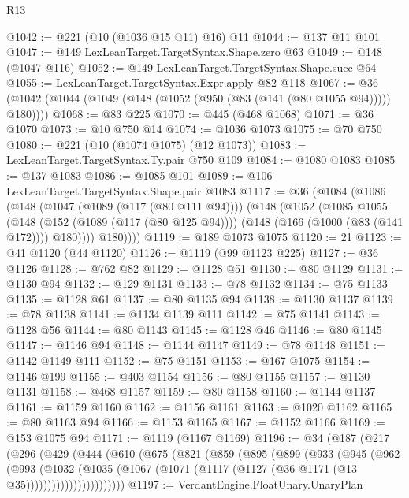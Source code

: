 \begin{lexlean}{R13}
\begin{coremodule}
@1042 := @221 (@10 (@1036 @15 @11) @16) @11
@1044 := @137 @11 @101
@1047 := @149 LexLeanTarget.TargetSyntax.Shape.zero @63
@1049 := @148 (@1047 @116)
@1052 := @149 LexLeanTarget.TargetSyntax.Shape.succ @64
@1055 := LexLeanTarget.TargetSyntax.Expr.apply @82 @118
@1067 := @36 (@1042 (@1044 (@1049 (@148 (@1052 (@950 (@83 (@141 (@80 @1055 @94))))) @180))))
@1068 := @83 @225
@1070 := @445 (@468 @1068)
@1071 := @36 @1070
@1073 := @10 @750 @14
@1074 := @1036 @1073
@1075 := @70 @750
@1080 := @221 (@10 (@1074 @1075) (@12 @1073))
@1083 := LexLeanTarget.TargetSyntax.Ty.pair @750 @109
@1084 := @1080 @1083
@1085 := @137 @1083
@1086 := @1085 @101
@1089 := @106 LexLeanTarget.TargetSyntax.Shape.pair @1083
@1117 := @36
    (@1084
      (@1086
        (@148
          (@1047 (@1089 (@117 (@80 @111 @94))))
          (@148
            (@1052
              (@1085
                @1055
                (@148
                  (@152 (@1089 (@117 (@80 @125 @94))))
                  (@148 (@166 (@1000 (@83 (@141 @172)))) @180))))
            @180))))
@1119 := @189 @1073 @1075
@1120 := 21
@1123 := @41 @1120 (@44 @1120)
@1126 := @1119 (@99 @1123 @225)
@1127 := @36 @1126
@1128 := @762 @82
@1129 := @1128 @51
@1130 := @80 @1129
@1131 := @1130 @94
@1132 := @129 @1131
@1133 := @78 @1132
@1134 := @75 @1133
@1135 := @1128 @61
@1137 := @80 @1135 @94
@1138 := @1130 @1137
@1139 := @78 @1138
@1141 := @1134 @1139 @111
@1142 := @75 @1141
@1143 := @1128 @56
@1144 := @80 @1143
@1145 := @1128 @46
@1146 := @80 @1145
@1147 := @1146 @94
@1148 := @1144 @1147
@1149 := @78 @1148
@1151 := @1142 @1149 @111
@1152 := @75 @1151
@1153 := @167 @1075
@1154 := @1146 @199
@1155 := @403 @1154
@1156 := @80 @1155
@1157 := @1130 @1131
@1158 := @468 @1157
@1159 := @80 @1158
@1160 := @1144 @1137
@1161 := @1159 @1160
@1162 := @1156 @1161
@1163 := @1020 @1162
@1165 := @80 @1163 @94
@1166 := @1153 @1165
@1167 := @1152 @1166
@1169 := @153 @1075 @94
@1171 := @1119 (@1167 @1169)
@1196 := @34
    (@187
      (@217
        (@296
          (@429
            (@444
              (@610
                (@675
                  (@821
                    (@859
                      (@895
                        (@899
                          (@933
                            (@945
                              (@962
                                (@993
                                  (@1032
                                    (@1035
                                      (@1067
                                        (@1071
                                          (@1117 (@1127 (@36 @1171 (@13 @35)))))))))))))))))))))))
@1197 := VerdantEngine.FloatUnary.UnaryPlan

\end{coremodule}
\end{lexlean}
